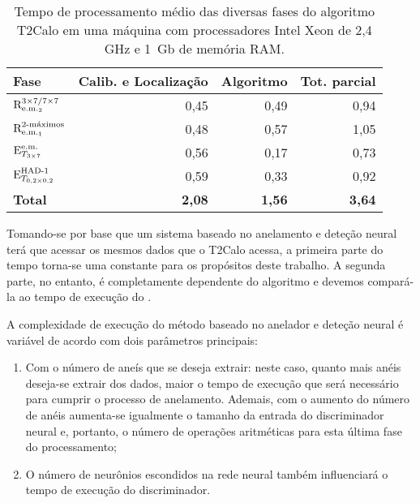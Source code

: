 \begin{table}
\caption{Tempo de processamento médio das diversas fases do algoritmo T2Calo
em uma máquina com processadores Intel Xeon de 2,4 GHz e 1~Gb de memória RAM.}
\label{tab:t2calo-performance}
\begin{center}
\begin{tabular}{|l|r|r|r|} \hline
\textbf{Fase} & \textbf{Calib. e Localização} & 
\textbf{Algoritmo} & \textbf{Tot. parcial}\\ \hline
$\rcore$ & 0,45 & 0,49 & 0,94 \\ 
$\eratio$ & 0,48 & 0,57 & 1,05 \\ 
$\etem$ & 0,56 & 0,17 & 0,73 \\ 
$\ethad$ & 0,59 & 0,33 & 0,92 \\ \hline
\textbf{Total} & \textbf{2,08} & \textbf{1,56} & \textbf{3,64} \\ \hline
\end{tabular}
\end{center}
\end{table}

Tomando-se por base que um sistema baseado no anelamento e deteção neural terá
que acessar os mesmos dados que o T2Calo acessa, a primeira parte do tempo
torna-se uma constante para os propósitos deste trabalho. A segunda parte, no
entanto, é completamente dependente do algoritmo e devemos compará-la ao tempo
de execução do .

A complexidade de execução do método baseado no anelador e deteção neural é
variável de acordo com dois parâmetros principais:

\begin{enumerate}
\item Com o número de aneís que se deseja extrair: neste caso, quanto mais
anéis deseja-se extrair dos dados, maior o tempo de execução que será
necessário para cumprir o processo de anelamento. Ademais, com o aumento do
número de anéis aumenta-se igualmente o tamanho da entrada do discriminador
neural e, portanto, o número de operações aritméticas para esta última fase do
processamento;
\item O número de neurônios escondidos na rede neural também influenciará o
tempo de execução do discriminador.
\end{enumerate}

